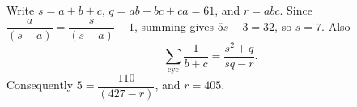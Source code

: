 Write $s=a+b+c$, $q=ab+bc+ca=61$, and $r=abc$. Since $\dfrac{a}{(s-a)}=\dfrac{s}{(s-a)}-1$, summing gives $5s-3=32$, so $s=7$. Also
\[
\sum_{\mathrm{cyc}}\dfrac{1}{b+c}=\dfrac{s^2+q}{sq-r}.
\]
Consequently $5=\dfrac{110}{(427-r)}$, and $\boxed{r=405}$.
